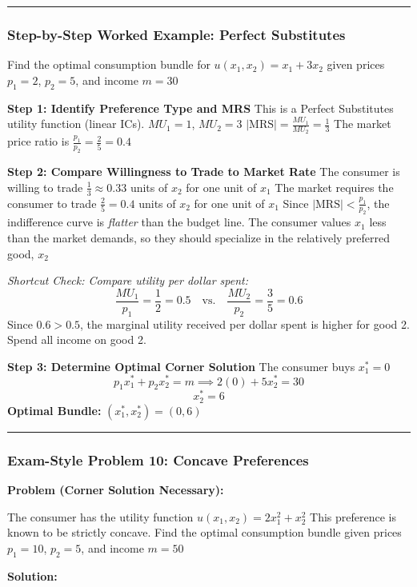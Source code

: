\documentclass{article}
\begin{document}
\noindent\rule{\linewidth}{0.4pt}

\subsubsection*{Step-by-Step Worked Example: Perfect Substitutes}

Find the optimal consumption bundle for $u(x_1, x_2) = x_1 + 3x_2$ given prices $p_1=2$, $p_2=5$, and income $m=30$

\textbf{Step 1: Identify Preference Type and MRS} This is a Perfect Substitutes utility function (linear ICs). $MU_1 = 1$, $MU_2 = 3$ $|\text{MRS}| = \frac{MU_1}{MU_2} = \frac{1}{3}$ The market price ratio is $\frac{p_1}{p_2} = \frac{2}{5} = 0.4$

\textbf{Step 2: Compare Willingness to Trade to Market Rate} The consumer is willing to trade $\frac{1}{3} \approx 0.33$ units of $x_2$ for one unit of $x_1$ The market requires the consumer to trade $\frac{2}{5} = 0.4$ units of $x_2$ for one unit of $x_1$ Since $|\text{MRS}| < \frac{p_1}{p_2}$, the indifference curve is \textit{flatter} than the budget line. The consumer values $x_1$ less than the market demands, so they should specialize in the relatively preferred good, $x_2$

\textit{Shortcut Check: Compare utility per dollar spent:}
\[ \frac{MU_1}{p_1} = \frac{1}{2} = 0.5 \quad \text{vs.} \quad \frac{MU_2}{p_2} = \frac{3}{5} = 0.6 \]
Since $0.6 > 0.5$, the marginal utility received per dollar spent is higher for good 2. Spend all income on good 2.

\textbf{Step 3: Determine Optimal Corner Solution} The consumer buys $x_1^*=0$
\[ p_1 x_1^* + p_2 x_2^* = m \implies 2(0) + 5x_2^* = 30 \]
\[ x_2^* = 6 \]
\textbf{Optimal Bundle:} $(x_1^*, x_2^*) = (0, 6)$

\noindent\rule{\linewidth}{0.4pt}

\subsubsection*{Exam-Style Problem 10: Concave Preferences}

\textbf{Problem (Corner Solution Necessary):}

The consumer has the utility function $u(x_1, x_2) = 2x_1^2 + x_2^2$ This preference is known to be strictly concave. Find the optimal consumption bundle given prices $p_1=10$, $p_2=5$, and income $m=50$

\textbf{Solution:}
\end{document}
